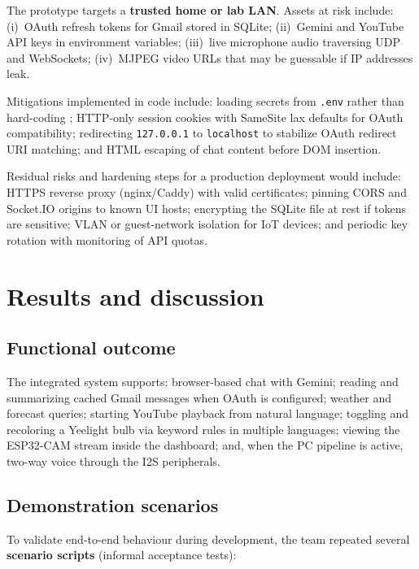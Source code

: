 \documentclass[12pt,a4paper]{report}
\begin{document}
The prototype targets a \textbf{trusted home or lab LAN}. Assets at risk include: (i)~OAuth refresh tokens for Gmail stored in SQLite; (ii)~Gemini and YouTube API keys in environment variables; (iii)~live microphone audio traversing UDP and WebSockets; (iv)~MJPEG video URLs that may be guessable if IP addresses leak.

Mitigations implemented in code include: loading secrets from \texttt{.env} rather than hard-coding \cite{python-dotenv}; HTTP-only session cookies with SameSite lax defaults for OAuth compatibility; redirecting \texttt{127.0.0.1} to \texttt{localhost} to stabilize OAuth redirect URI matching; and HTML escaping of chat content before DOM insertion.

Residual risks and hardening steps for a production deployment would include: HTTPS reverse proxy (nginx/Caddy) with valid certificates; pinning CORS and Socket.IO origins to known UI hosts; encrypting the SQLite file at rest if tokens are sensitive; VLAN or guest-network isolation for IoT devices; and periodic key rotation with monitoring of API quotas.

\chapter{Results and discussion}

\section{Functional outcome}

The integrated system supports: browser-based chat with Gemini; reading and summarizing cached Gmail messages when OAuth is configured; weather and forecast queries; starting YouTube playback from natural language; toggling and recoloring a Yeelight bulb via keyword rules in multiple languages; viewing the ESP32-CAM stream inside the dashboard; and, when the PC pipeline is active, two-way voice through the I2S peripherals.

\section{Demonstration scenarios}

To validate end-to-end behaviour during development, the team repeated several \textbf{scenario scripts} (informal acceptance tests):
\end{document}
